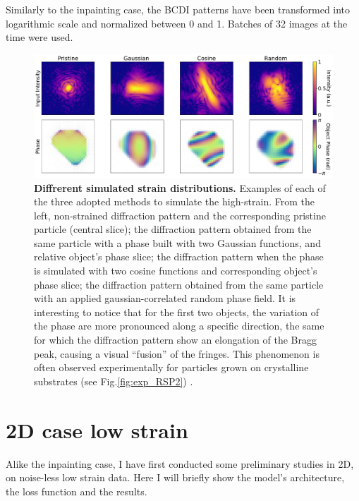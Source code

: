 Similarly to the inpainting case, the BCDI patterns have been transformed into logarithmic scale and normalized between 
0 and 1. Batches of 32 images at the time were used. 

\begin{figure}[H]
    \centering
    \includegraphics[width=\textwidth]{figures/Phasing/strains_creation.pdf}
    \caption{\textbf{Diffrerent simulated strain distributions.}  Examples of each of the three adopted methods to simulate 
    the high-strain. From the left, non-strained diffraction pattern and the corresponding pristine particle (central slice); 
    the diffraction pattern obtained from the same particle with a phase built with two Gaussian functions, and relative 
    object's phase slice; the diffraction pattern when the phase is simulated with two cosine functions and corresponding 
    object's phase slice; the diffraction pattern obtained from the same particle with an applied gaussian-correlated 
    random phase field. It is interesting to notice that for the first two objects, the variation of the phase are 
    more pronounced along a specific direction, the same for which the diffraction pattern show an elongation of the 
    Bragg peak, causing a visual ``fusion'' of the fringes. This phenomenon is often observed experimentally for particles 
    grown on crystalline substrates (see Fig.\ref{fig:exp_RSP2}) \cite{Cha_2010, Minkevich2007_virginie, Diaz_2010}. }
    \label{fig:strains_creation}
\end{figure}

\section{2D case low strain}\label{chp:2d_nostrain}
Alike the inpainting case, I have first conducted some preliminary studies in 2D, on noise-less low strain data. Here I will 
briefly show the model's architecture, the loss function and the results. 
